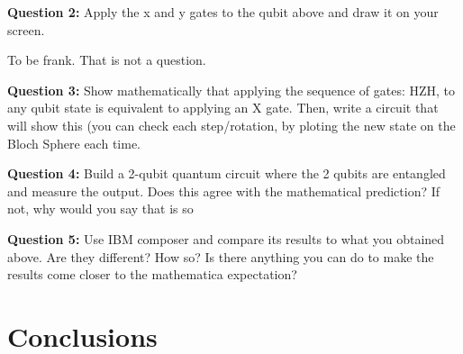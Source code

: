 \textbf{Question 2:}
Apply the x and y gates to the qubit above and draw it on your screen.

To be frank. That is not a question.

\textbf{Question 3:}
Show mathematically that applying the sequence of gates: HZH, to any qubit state is equivalent to applying an X gate. Then, write a circuit that will show this (you can check each step/rotation, by ploting the new state on the Bloch Sphere each time.


\textbf{Question 4:}
Build a 2-qubit quantum circuit where the 2 qubits are entangled and measure the output. Does this agree with the mathematical prediction? If not, why would you say that is so

\textbf{Question 5:}
Use IBM composer and compare its results to what you obtained above. Are they different? How so? Is there anything you can do to make the results come closer to the mathematica expectation?

\section{Conclusions}